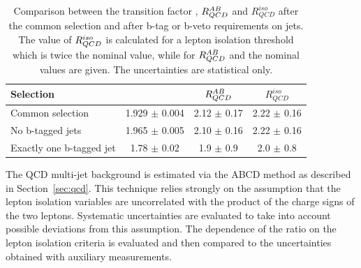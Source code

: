 \begin{table} [!tp]
	  \caption{Comparison between the transition factor \rqcd, $R_{QCD}^{AB}$ and $R_{QCD}^{iso}$ after the common selection 
	and after b-tag or b-veto requirements on jets. 
	The value of $R_{QCD}^{iso}$ is calculated for a  lepton isolation threshold which is twice the nominal value,
	while  for  $R_{QCD}^{AB}$ and \rqcd the nominal values are given. The uncertainties are statistical only.}
	\vspace{3mm}

	\begin{center}
	\begin{tabular}{l  c c c }
\hline 
\hline
Selection  		&  \rqcd  			&  $R_{QCD}^{AB}$  		&  $R_{QCD}^{iso}$ \\ 
\hline
Common selection 		&   1.929 $\pm$     0.004	&	2.12 $\pm$ 0.17		&	2.22 $\pm$ 0.16	\\
No b-tagged jets		&  1.965   $\pm$   0.005    	& 2.10   $\pm$	0.16 		&	2.22 $\pm$ 0.16	\\
Exactly one b-tagged jet	&  1.78    $\pm$   0.02 	& 1.9   $\pm$	0.9 		&	2.0  $\pm$ 0.8	\\
\hline
\hline
	\end{tabular}
	\label{table:MCsub}
	\end{center}
\end{table}

The QCD multi-jet background is estimated via the ABCD method as
described in Section~\ref{sec:qcd}. This technique relies strongly on
the assumption that the lepton isolation variables are uncorrelated with the product of the
charge signs of the two leptons. Systematic uncertainties
are evaluated to take into account possible deviations from this assumption.
The dependence of the ratio  \rqcd on the lepton isolation criteria is evaluated and then
compared to the uncertainties obtained with auxiliary measurements. 




